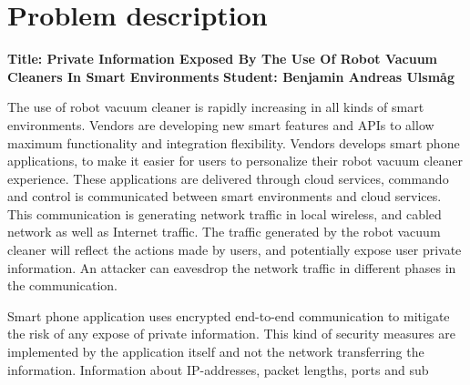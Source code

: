 \chapter*{Problem description}


\textbf{Title: Private Information Exposed By The Use Of Robot Vacuum Cleaners In Smart Environments}
\newline
\textbf{Student: Benjamin Andreas Ulsmåg}
\newline
\newline

The use of robot vacuum cleaner is rapidly increasing in all kinds of smart environments. Vendors are developing new smart features and APIs to allow maximum functionality and integration flexibility. Vendors develops smart phone applications, to make it easier for users to personalize their robot vacuum cleaner experience. These applications are delivered through cloud services, commando and control is communicated between smart environments and cloud services. This communication is generating network traffic in local wireless, and cabled network as well as Internet traffic. The traffic generated by the robot vacuum cleaner will reflect the actions made by users, and potentially expose user private information. An attacker can eavesdrop the network traffic in different phases in the communication. 

Smart phone application uses encrypted end-to-end communication to mitigate the risk of any expose of private information. This kind of security measures are implemented by the application itself and not the network transferring the information. Information about IP-addresses, packet lengths, ports and sub




